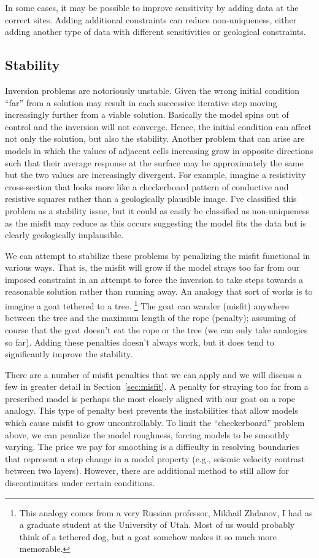 In some cases, it may be possible to improve sensitivity by adding data at the correct sites.  Adding additional constraints can reduce non-uniqueness, either adding another type of data with different sensitivities or geological constraints.

\subsection{Stability}
Inversion problems are notoriously unstable.  Given the wrong initial condition ``far'' from a solution may result in each successive iterative step moving increasingly further from a viable solution.  Basically the model spins out of control and the inversion will not converge.  Hence, the initial condition can affect not only the solution, but also the stability.  Another problem that can arise are models in which the values of adjacent cells increasing grow in opposite directions such that their average response at the surface may be approximately the same but the two values are increasingly divergent.  For example, imagine a resistivity cross-section that looks more like a checkerboard pattern of conductive and resistive squares rather than a geologically plausible image.  I've classified this problem as a stability issue, but it could as easily be classified as non-uniqueness as the misfit may reduce as this occurs suggesting the model fits the data but is clearly geologically implausible.

We can attempt to stabilize these problems by penalizing the misfit functional in various ways.  That is, the misfit will grow if the model strays too far from our imposed constraint in an attempt to force the inversion to take steps towards a reasonable solution rather than running away.  An analogy that sort of works is to imagine a goat tethered to a tree.
\footnote{This analogy comes from a very Russian professor, Mikhail Zhdanov, I had as a graduate student at the University of Utah.  Most of us would probably think of a tethered dog, but a goat somehow makes it so much more memorable.}
The goat can wander (misfit) anywhere between the tree and the maximum length of the rope (penalty); assuming of course that the goat doesn't eat the rope or the tree (we can only take analogies so far).  Adding these penalties doesn't always work, but it does tend to significantly improve the stability.

There are a number of misfit penalties that we can apply and we will discuss a few in greater detail in Section~\ref{sec:misfit}.  A penalty for straying too far from a prescribed model is perhaps the most closely aligned with our goat on a rope analogy.  This type of penalty best prevents the instabilities that allow models which cause misfit to grow uncontrollably.  To limit the ``checkerboard'' problem above, we can penalize the model roughness, forcing models to be smoothly varying.  The price we pay for smoothing is a difficulty in resolving boundaries that represent a step change in a model property (e.g., seismic velocity contrast between two layers).  However, there are additional method to still allow for discontinuities under certain conditions.

